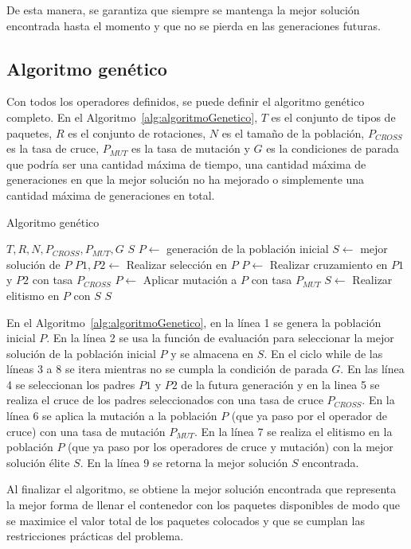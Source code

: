 De esta manera, se garantiza que siempre se mantenga la mejor solución encontrada hasta el momento y que no se pierda en las generaciones futuras.

\subsection{Algoritmo genético}

Con todos los operadores definidos, se puede definir el algoritmo genético completo. En el Algoritmo~\ref{alg:algoritmoGenetico}, $T$ es el conjunto de tipos de paquetes, $R$ es el conjunto de rotaciones, $N$ es el tamaño de la población, $P_{CROSS}$ es la tasa de cruce, $P_{MUT}$ es la tasa de mutación y $G$ es la condiciones de parada que podría ser una cantidad máxima de tiempo, una cantidad máxima de generaciones en que la mejor solución no ha mejorado o simplemente una cantidad máxima de generaciones en total.

\begin{algorithm}[H]
    \caption{Algoritmo genético}\label{alg:algoritmoGenetico}
    \begin{algorithmic}[1]
        \Require $T, R, N, P_{CROSS}, P_{MUT}, G$
        \Ensure $S$
        \State $P \leftarrow$ generación de la población inicial
        \State $S \leftarrow$ mejor solución de $P$
        \State $P1,P2 \leftarrow$ Realizar selección en $P$
        \State $P \leftarrow$ Realizar cruzamiento en $P1$ y $P2$ con tasa $P_{CROSS}$
        \State $P \leftarrow$ Aplicar mutación a $P$ con tasa $P_{MUT}$
        \State $S \leftarrow$ Realizar elitismo en $P$ con $S$
        \EndWhile
        \State \Return $S$
    \end{algorithmic}
\end{algorithm}

En el Algoritmo~\ref{alg:algoritmoGenetico}, en la línea 1 se genera la población inicial $P$. En la línea 2 se usa la función de evaluación para seleccionar la mejor solución de la población inicial $P$ y se almacena en $S$. En el ciclo while de las líneas 3 a 8 se itera mientras no se cumpla la condición de parada $G$. En las línea 4 se seleccionan los padres $P1$ y $P2$ de la futura generación y en la linea 5 se realiza el cruce de los padres seleccionados con una tasa de cruce $P_{CROSS}$. En la línea 6 se aplica la mutación a la población $P$ (que ya paso por el operador de cruce) con una tasa de mutación $P_{MUT}$. En la línea 7 se realiza el elitismo en la población $P$ (que ya paso por los operadores de cruce y mutación) con la mejor solución élite $S$. En la línea 9 se retorna la mejor solución $S$ encontrada.

Al finalizar el algoritmo, se obtiene la mejor solución encontrada que representa la mejor forma de llenar el contenedor con los paquetes disponibles de modo que se maximice el valor total de los paquetes colocados y que se cumplan las restricciones prácticas del problema.